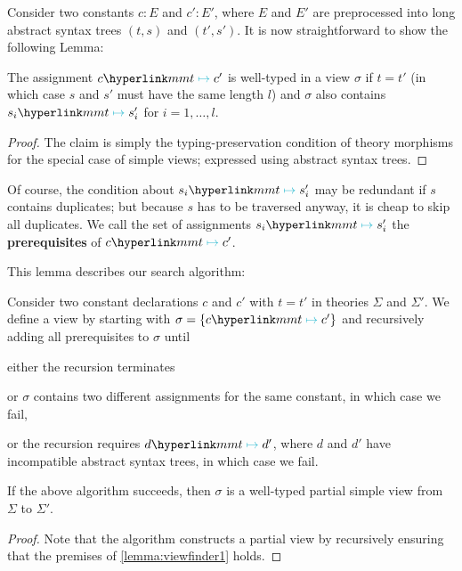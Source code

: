 Consider two constants $c:E$ and $c':E'$, where $E$ and $E'$ are preprocessed into long abstract syntax trees $(t,s)$ and $(t',s')$.
It is now straightforward to show the following Lemma:
\begin{lemma}\label{lemma:viewfinder1}
The assignment $c\mmtass c'$ is well-typed in a view $\sigma$ if $t=t'$ (in which case $s$ and $s'$ must have the same length $l$) and $\sigma$ also contains $s_i\mmtass s'_i$ for $i=1,\ldots,l$.
\end{lemma}
\begin{proof}
 The claim is simply the typing-preservation condition of theory morphisms for the special case of simple views; expressed using abstract syntax trees.
\end{proof}
Of course, the condition about $s_i\mmtass s'_i$ may be redundant if $s$ contains duplicates; but because $s$ has to be traversed anyway, it is cheap to skip all duplicates. We call the set of assignments $s_i\mmtass s'_i$ the \textbf{prerequisites} of $c\mmtass c'$.

This lemma describes our search algorithm: 
\begin{lemma}
Consider two constant declarations $c$ and $c'$ with $t=t'$ in theories $\Sigma$ and $\Sigma'$.
We define a view by starting with $\sigma=\{c\mmtass c'\}$ and recursively adding all prerequisites to $\sigma$ until
\begin{compactitem}
 \item either the recursion terminates
 \item or $\sigma$ contains two different assignments for the same constant, in which case we fail,
 \item or the recursion requires $d\mmtass d'$, where $d$ and $d'$ have incompatible abstract syntax trees, in which case we fail.
\end{compactitem}

If the above algorithm succeeds, then $\sigma$ is a well-typed partial simple view from $\Sigma$ to $\Sigma'$.
\end{lemma}
\begin{proof}
	Note that the algorithm constructs a partial view by recursively ensuring that the premises of \autoref{lemma:viewfinder1} holds.
\end{proof}


